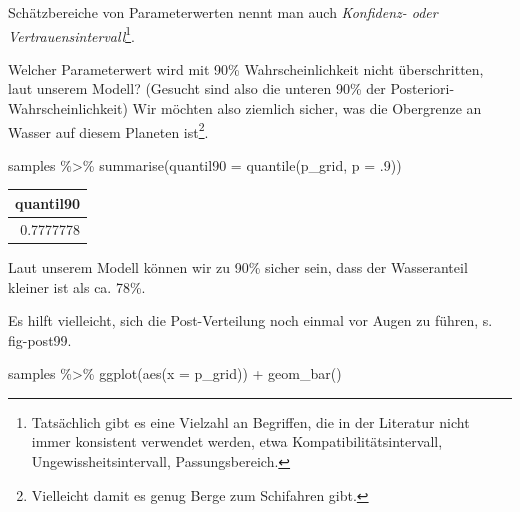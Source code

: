 \documentclass[
  a4paper,
  DIV=11]{scrreprt}
\newenvironment{Shaded}{\begin{snugshade}}{\end{snugshade}}
\newcommand{\AttributeTok}[1]{\textcolor[rgb]{0.40,0.45,0.13}{#1}}
\newcommand{\DecValTok}[1]{\textcolor[rgb]{0.68,0.00,0.00}{#1}}
\newcommand{\FunctionTok}[1]{\textcolor[rgb]{0.28,0.35,0.67}{#1}}
\newcommand{\NormalTok}[1]{\textcolor[rgb]{0.00,0.23,0.31}{#1}}
\newcommand{\SpecialCharTok}[1]{\textcolor[rgb]{0.37,0.37,0.37}{#1}}
\theoremstyle{definition}
\theoremstyle{remark}
\begin{document}
\begin{tcolorbox}[enhanced jigsaw, leftrule=.75mm, left=2mm, bottomrule=.15mm, opacityback=0, coltitle=black, colbacktitle=quarto-callout-important-color!10!white, opacitybacktitle=0.6, rightrule=.15mm, toptitle=1mm, colback=white, colframe=quarto-callout-important-color-frame, arc=.35mm, toprule=.15mm, breakable, titlerule=0mm, bottomtitle=1mm, title=\textcolor{quarto-callout-important-color}{\faExclamation}\hspace{0.5em}{Wichtig}]
Schätzbereiche von Parameterwerten nennt man auch \emph{Konfidenz- oder
Vertrauensintervall}\footnote{Tatsächlich gibt es eine Vielzahl an
  Begriffen, die in der Literatur nicht immer konsistent verwendet
  werden, etwa Kompatibilitätsintervall, Ungewissheitsintervall,
  Passungsbereich.}.
\end{tcolorbox}

Welcher Parameterwert wird mit 90\% Wahrscheinlichkeit nicht
überschritten, laut unserem Modell? (Gesucht sind also die unteren 90\%
der Posteriori-Wahrscheinlichkeit) Wir möchten also ziemlich sicher, was
die Obergrenze an Wasser auf diesem Planeten ist\footnote{Vielleicht
  damit es genug Berge zum Schifahren gibt.}.

\begin{Shaded}
\begin{Highlighting}[]
\NormalTok{samples }\SpecialCharTok{\%\textgreater{}\%} 
  \FunctionTok{summarise}\NormalTok{(}\AttributeTok{quantil90 =} \FunctionTok{quantile}\NormalTok{(p\_grid, }\AttributeTok{p =}\NormalTok{ .}\DecValTok{9}\NormalTok{))}
\end{Highlighting}
\end{Shaded}

\begin{longtable}[]{@{}r@{}}
\toprule()
quantil90 \\
\midrule()
\endhead
0.7777778 \\
\bottomrule()
\end{longtable}

Laut unserem Modell können wir zu 90\% sicher sein, dass der
Wasseranteil kleiner ist als ca. 78\%.

Es hilft vielleicht, sich die Post-Verteilung noch einmal vor Augen zu
führen, s. fig-post99.

\begin{Shaded}
\begin{Highlighting}[]
\NormalTok{samples }\SpecialCharTok{\%\textgreater{}\%} 
  \FunctionTok{ggplot}\NormalTok{(}\FunctionTok{aes}\NormalTok{(}\AttributeTok{x =}\NormalTok{ p\_grid)) }\SpecialCharTok{+}
  \FunctionTok{geom\_bar}\NormalTok{()}
\end{Highlighting}
\end{Shaded}
\end{document}
